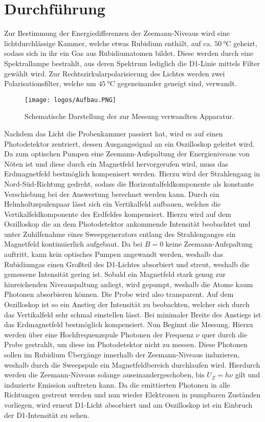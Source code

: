 \section{Durchführung}
\label{sec:Durchführung}
Zur Bestimmung der Energiedifferenzen der Zeemann-Niveaus wird eine lichtdurchlässige Kammer, welche etwas Rubidium enthält, auf ca. $\SI{50}{\celsius}$ geheizt, sodass sich in ihr ein Gas aus Rubidiumatomen bildet. Diese werden durch eine Spektrallampe bestrahlt, aus deren Spektrum lediglich die D1-Linie mittels Filter gewählt wird. Zur Rechtszirkularpolarisierung des Lichtes werden zwei Polarisationsfilter, welche um $\SI{45}{\celsius}$ gegeneinander geneigt sind, verwandt.
\begin{figure}
  \centering
  \texttt{[image: logos/Aufbau.PNG]}
  \caption{Schematische Darstellung der zur Messung verwandten Apparatur\cite{Anleitung}.}
  \label{fig:Aufbau}
\end{figure}
Nachdem das Licht die Probenkammer passiert hat, wird es auf einen Photodetektor zentriert, dessen Ausgangssignal an ein Oszilloskop geleitet wird.
Da zum optischen Pumpen eine Zeemann-Aufspaltung der Energieniveaus von Nöten ist und diese durch ein Magnetfeld hervorgerufen wird, muss das Erdmagnetfeld bestmöglich kompenisert werden. Hierzu wird der Strahlengang in Nord-Süd-Richtung gedreht, sodass die Horizontalfeldkomponente als konstante Verschiebung bei der Auswertung berechnet werden kann. Durch ein Helmholtzspulenpaar lässt sich ein Vertikalfeld aufbauen, welches die Vertikalfeldkomponente des Erdfeldes kompensiert. Hierzu wird auf dem Oszilloskop die an dem Photodetektor ankommende Intensität beobachtet und unter Zuhilfenahme eines Sweepgenerators entlang des Strahlenganges ein Magnetfeld kontinuierlich aufgebaut. Da bei $B=0$ keine Zeemann-Aufspaltung auftritt, kann kein optisches Pumpen angewandt werden, weshalb das Rubidiumgas einen Großteil des D1-Lichtes absorbiert und streut, weshalb die gemessene Intensität gering ist. Sobald ein Magnetfeld stark genug zur hinreichenden Niveauspaltung anliegt, wird gepumpt, weshalb die Atome kaum Photonen absorbieren können. Die Probe wird also transparent. Auf dem Oszilloskop ist so ein Anstieg der Intensität zu beobachten, welcher sich durch das Vertikalfeld sehr schmal einstellen lässt. Bei minimaler Breite des Anstiegs ist das Erdmagnetfeld bestmöglich kompensiert.
Nun Beginnt die Messung. Hierzu werden über eine Hochfrequenzspule Photonen der Frequenz $\nu$ quer durch die Probe gestrahlt, um diese im Photodetektor nicht zu messen. Diese Photonen sollen im Rubidium Übergänge innerhalb der Zeemann-Niveaus induzieren, weshalb durch die Sweepspule ein Magnetfeldbereich durchlaufen wird. Hierdurch werden die Zeemann-Niveaus solange auseinandergeschoben, bis $U_Z=h\nu$ gilt und induzierte Emission auftreten kann. Da die emittierten Photonen in alle Richtungen gestreut werden und nun wieder Elektronen in pumpbaren Zuständen vorliegen, wird erneut D1-Licht absorbiert und am Oszilloskop ist ein Einbruch der D1-Intensität zu sehen.
